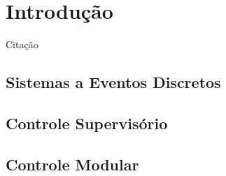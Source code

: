\section{Introdução}
Citação \cite{wonham1989}
\subsection{Sistemas a Eventos Discretos}
\subsection{Controle Supervisório}
\subsection{Controle Modular}
